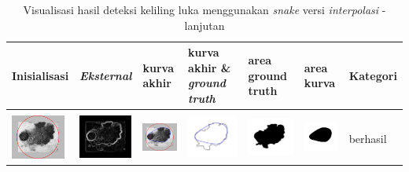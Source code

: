 \begin{table}[H]
	\centering
	\caption{Visualisasi hasil deteksi keliling luka menggunakan \emph{snake} versi \emph{interpolasi} - lanjutan}
	\label{tabel_hasil_3_interp}
	\begin{tabular}{|m{0.7in}|m{0.7in}|m{0.7in}|m{0.7in}|m{0.7in}|m{0.7in}|m{0.7in}|}
		\hline
		\textbf{Inisialisasi} & \textbf{\emph{Eksternal}} & \textbf{kurva akhir} & \textbf{kurva akhir \& \emph{ground truth}}& \textbf{area ground truth} & \textbf{area kurva} & \textbf{Kategori} \\
		\hline
		
		&  &  & & & &  \\
		\includegraphics[width=0.7in]{dataset/dataset_3/luka_hitam/ready/27_interp_init.jpg}&
		\includegraphics[width=0.7in]{dataset/dataset_3/luka_hitam/ready/27_interp_ext.jpg}&
		\includegraphics[width=0.7in]{dataset/dataset_3/luka_hitam/ready/27_interp_result.jpg}&
		\includegraphics[width=0.7in]{dataset/dataset_3/luka_hitam/ready/27_gt_r.jpg}&
		\includegraphics[width=0.7in]{dataset/dataset_3/luka_hitam/ready/27_r.jpg}&
		\includegraphics[width=0.7in]{dataset/dataset_3/luka_hitam/ready/27_interp_r.jpg}&
		berhasil\\
		\hline
		

\end{tabular}
\end{table}
